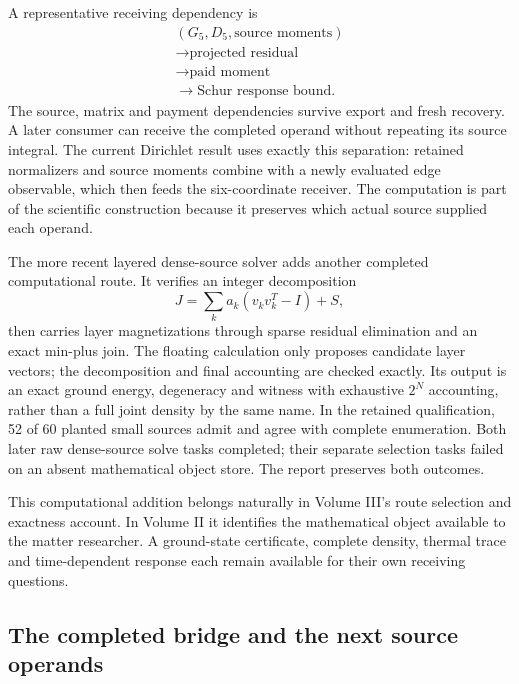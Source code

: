 A representative receiving dependency is
\begin{equation}
 \begin{gathered}
 (G_5,D_5,\text{source moments})\\
 \longrightarrow\text{projected residual}\\
 \longrightarrow\text{paid moment}\\
 \longrightarrow\text{Schur response bound}.
 \end{gathered}
\end{equation}
The source, matrix and payment dependencies survive export and fresh recovery. A later consumer can receive the completed operand without repeating its source integral. The current Dirichlet result uses exactly this separation: retained normalizers and source moments combine with a newly evaluated edge observable, which then feeds the six-coordinate receiver. The computation is part of the scientific construction because it preserves which actual source supplied each operand.

The more recent layered dense-source solver adds another completed computational route. It verifies an integer decomposition
\begin{equation}
 J=\sum_k a_k(v_kv_k^T-I)+S,
\end{equation}
then carries layer magnetizations through sparse residual elimination and an exact min-plus join. The floating calculation only proposes candidate layer vectors; the decomposition and final accounting are checked exactly. Its output is an exact ground energy, degeneracy and witness with exhaustive $2^N$ accounting, rather than a full joint density by the same name. In the retained qualification, 52 of 60 planted small sources admit and agree with complete enumeration. Both later raw dense-source solve tasks completed; their separate selection tasks failed on an absent mathematical object store. The report preserves both outcomes.

This computational addition belongs naturally in Volume III's route selection and exactness account. In Volume II it identifies the mathematical object available to the matter researcher. A ground-state certificate, complete density, thermal trace and time-dependent response each remain available for their own receiving questions.

\subsection{The completed bridge and the next source operands}

